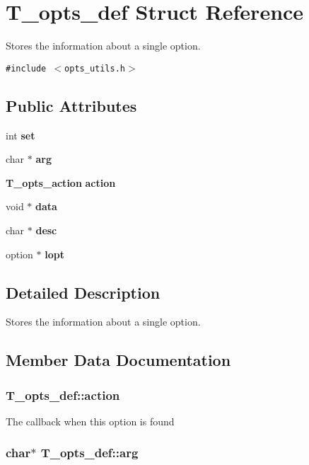 \section{T\_\-opts\_\-def Struct Reference}
\label{structT__opts__def}
Stores the information about a single option. 


{\tt \#include $<$opts\_\-utils.h$>$}

\subsection*{Public Attributes}
\begin{CompactItemize}
\item 
int {\bf set}
\item 
char $\ast$ {\bf arg}
\item 
{\bf T\_\-opts\_\-action} {\bf action}
\item 
void $\ast$ {\bf data}
\item 
char $\ast$ {\bf desc}
\item 
option $\ast$ {\bf lopt}
\end{CompactItemize}


\subsection{Detailed Description}
Stores the information about a single option.



\subsection{Member Data Documentation}
\subsubsection{ T\_\-opts\_\-def::action}\label{structT__opts__def_m2}


The callback when this option is found 
\subsubsection{\setlength{\rightskip}{0pt plus 5cm}char$\ast$ T\_\-opts\_\-def::arg}\label{structT__opts__def_m1}



